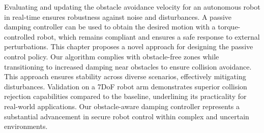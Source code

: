 Evaluating and updating the obstacle avoidance velocity for an autonomous robot in real-time ensures robustness against noise and disturbances. A passive damping controller can be used to obtain the desired motion with a torque-controlled robot, which remains compliant and ensures a safe response to external perturbations.
This chapter proposes a novel approach for designing the passive control policy. Our algorithm complies with obstacle-free zones while transitioning to increased damping near obstacles to ensure collision avoidance. This approach ensures stability across diverse scenarios, effectively mitigating disturbances.
Validation on a 7DoF robot arm demonstrates superior collision rejection capabilities compared to the baseline, underlining its practicality for real-world applications. 
Our obstacle-aware damping controller represents a substantial advancement in secure robot control within complex and uncertain environments.


% 
% 
% 


